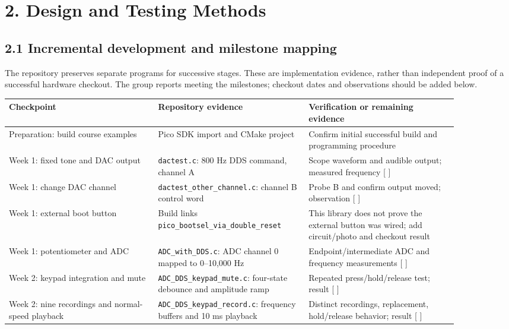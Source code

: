 \documentclass[11pt,letterpaper]{article}
\begin{document}
\section*{2. Design and Testing Methods}

\subsection*{2.1 Incremental development and milestone mapping}

The repository preserves separate programs for successive stages. These are implementation evidence, rather than independent proof of a successful hardware checkout. The group reports meeting the milestones; checkout dates and observations should be added below.

\begingroup\small
\setlength{\tabcolsep}{5pt}
\begin{longtable}{|>{\raggedright\arraybackslash}p{0.295\linewidth}|>{\raggedright\arraybackslash}p{0.295\linewidth}|>{\raggedright\arraybackslash}p{0.295\linewidth}|}
\hline
\textbf{Checkpoint} & \textbf{Repository evidence} & \textbf{Verification or remaining evidence} \\ \hline
\endhead
Preparation: build course examples & Pico SDK import and CMake project & Confirm initial successful build and programming procedure \\ \hline
Week 1: fixed tone and DAC output & \texttt{dactest.c}: 800 Hz DDS command, channel A & Scope waveform and audible output; measured frequency [ ] \\ \hline
Week 1: change DAC channel & \texttt{dactest\_other\_channel.c}: channel B control word & Probe B and confirm output moved; observation [ ] \\ \hline
Week 1: external boot button & Build links \texttt{pico\_bootsel\_via\_double\_reset} & This library does not prove the external button was wired; add circuit/photo and checkout result \\ \hline
Week 1: potentiometer and ADC & \texttt{ADC\_with\_DDS.c}: ADC channel 0 mapped to 0--10,000 Hz & Endpoint/intermediate ADC and frequency measurements [ ] \\ \hline
Week 2: keypad integration and mute & \texttt{ADC\_DDS\_keypad\_mute.c}: four-state debounce and amplitude ramp & Repeated press/hold/release test; result [ ] \\ \hline
Week 2: nine recordings and normal-speed playback & \texttt{ADC\_DDS\_keypad\_record.c}: frequency buffers and 10 ms playback & Distinct recordings, replacement, hold/release behavior; result [ ] \\ \hline

\end{longtable}
\end{document}

